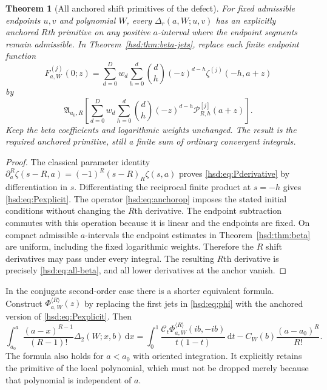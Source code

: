 \documentclass[11pt]{article}
\numberwithin{equation}{section}
\newtheorem{theorem}{Theorem}[section]
\theoremstyle{definition}\newtheorem{definition}[theorem]{Definition}
\theoremstyle{remark}\newtheorem{remark}[theorem]{Remark}
\newcommand{\dd}{\,\mathrm d}
\newcommand{\CC}{\mathcal C}
\newcommand{\PP}{\mathcal P}
\begin{document}
\begin{theorem}[All anchored shift primitives of the defect]
\label{hsd:thm:shiftprimitive}
For fixed admissible endpoints $u,v$ and polynomial $W$, every
$\Delta_r(a,W;u,v)$ has an explicitly anchored $R$th primitive on any
positive $a$-interval where the endpoint segments remain admissible.
In Theorem~\ref{hsd:thm:beta-jets}, replace each finite endpoint function
\begin{equation}\label{hsd:eq:Fjfinite}
 F_{a,W}^{(j)}(0;z)=\sum_{d=0}^D w_d\sum_{h=0}^d
                 \binom dh(-z)^{d-h}\zeta^{(j)}(-h,a+z)
\end{equation}
by
\begin{equation}\label{hsd:eq:anchoredF}
 \mathfrak A_{a_0,R}\left[
 \sum_{d=0}^D w_d\sum_{h=0}^d\binom dh(-z)^{d-h}
                            \PP_{R,h}^{[j]}(a+z)\right].
\end{equation}
Keep the beta coefficients and logarithmic weights unchanged. The
result is the required anchored primitive, still a finite sum of
ordinary convergent integrals.
\end{theorem}
\begin{proof}
The classical parameter identity
$\partial_a^R\zeta(s-R,a)=(-1)^R(s-R)_R\zeta(s,a)$
proves \eqref{hsd:eq:Pderivative} by differentiation in $s$.
Differentiating the reciprocal finite product at $s=-h$ gives
\eqref{hsd:eq:Pexplicit}. The operator
\eqref{hsd:eq:anchorop} imposes the stated initial conditions without
changing the $R$th derivative. The endpoint subtraction commutes with
this operation because it is linear and the endpoints are fixed.
On compact admissible $a$-intervals the endpoint estimates in
Theorem~\ref{hsd:thm:beta} are uniform, including the fixed logarithmic
weights. Therefore the $R$ shift derivatives may pass under every
integral. The resulting $R$th derivative is precisely
\eqref{hsd:eq:all-beta}, and all lower derivatives at the anchor vanish.
\end{proof}

In the conjugate second-order case there is a shorter equivalent formula.
Construct $\Phi_{a,W}^{\langle R\rangle}(z)$ by replacing the first jets
in \eqref{hsd:eq:phi} with the anchored version of
\eqref{hsd:eq:Pexplicit}. Then
\begin{equation}\label{hsd:eq:anchoredDelta2}
 \int_{a_0}^{a}\frac{(a-x)^{R-1}}{(R-1)!}\Delta_2(W;x,b)\dd x
 =\int_0^1\frac{\CC_t\Phi_{a,W}^{\langle R\rangle}(ib,-ib)}{t(1-t)}\dd t
                 -C_W(b)\frac{(a-a_0)^R}{R!}.
\end{equation}
The formula also holds for $a<a_0$ with oriented integration.
It explicitly retains the primitive of the local polynomial, which must
not be dropped merely because that polynomial is independent of $a$.
\end{document}
